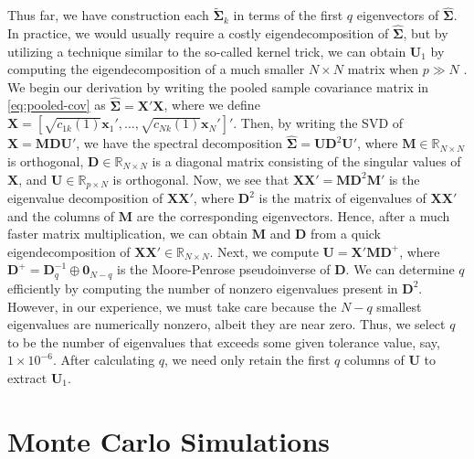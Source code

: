 \documentclass[11pt]{article}
\begin{document}
Thus far, we have construction each $\tilde{\bm \Sigma}_k$ in terms of the first $q$ eigenvectors of $\widehat{\bm \Sigma}$. In practice, we would usually require a costly eigendecomposition of $\widehat{\bm \Sigma}$, but by utilizing a technique similar to the so-called kernel trick, we can obtain $\bm U_1$ by computing the eigendecomposition of a much smaller $N \times N$ matrix when $p \gg N$ \citep{Hastie:2008dt}. We begin our derivation by writing the pooled sample covariance matrix in \eqref{eq:pooled-cov} as $\widehat{\bm\Sigma} = \bm X' \bm X$, where we define $\bm X = [\sqrt{c_{1k}(1)} \bm x_1', \ldots,  \sqrt{c_{Nk}(1)} \bm x_N']'$. Then, by writing the SVD of $\bm X = \bm M \bm D \bm U'$, we have the spectral decomposition $\widehat{\bm\Sigma} = \bm U \bm D^2 \bm U'$, where $\bm M \in \mathbb{R}_{N \times N}$ is orthogonal, $\bm D \in \mathbb{R}_{N \times N}$ is a diagonal matrix consisting of the singular values of $\bm X$, and $\bm U \in \mathbb{R}_{p \times N}$ is orthogonal. Now, we see that $\bm X \bm X' = \bm M \bm D^2 \bm M'$ is the eigenvalue decomposition of $\bm X \bm X'$, where $\bm D^2$ is the matrix of eigenvalues of $\bm X \bm X'$ and the columns of $\bm M$  are the corresponding eigenvectors. Hence, after a much faster matrix multiplication, we can obtain $\bm M$ and $\bm D$ from a quick eigendecomposition of $\bm X \bm X' \in \mathbb{R}_{N \times N}$. Next, we compute $\bm U = \bm X' \bm M \bm D^{+}$, where $\bm D^{+} = \bm D_q^{-1} \oplus \bm 0_{N-q}$ is the Moore-Penrose pseudoinverse of $\bm D$. We can determine $q$ efficiently by computing the number of nonzero eigenvalues present in $\bm D^2$. However, in our experience, we must take care because the $N-q$ smallest eigenvalues are numerically nonzero, albeit they are near zero. Thus, we select $q$ to be the number of eigenvalues that exceeds some given tolerance value, say, $1 \times 10^{-6}$. After calculating $q$, we need only retain the first $q$ columns of $\bm U$ to extract $\bm U_1$.

\section{Monte Carlo Simulations}
\end{document}
